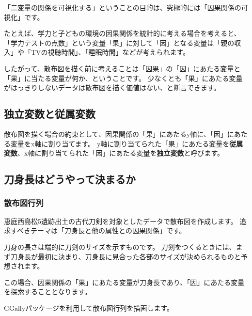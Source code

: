 \documentclass[]{article}
\newenvironment{Shaded}{\begin{snugshade}}{\end{snugshade}}
\newcommand{\CommentTok}[1]{\textcolor[rgb]{0.56,0.35,0.01}{\textit{#1}}}
\newcommand{\DataTypeTok}[1]{\textcolor[rgb]{0.13,0.29,0.53}{#1}}
\newcommand{\KeywordTok}[1]{\textcolor[rgb]{0.13,0.29,0.53}{\textbf{#1}}}
\newcommand{\NormalTok}[1]{#1}
\newcommand{\OperatorTok}[1]{\textcolor[rgb]{0.81,0.36,0.00}{\textbf{#1}}}
\newcommand{\StringTok}[1]{\textcolor[rgb]{0.31,0.60,0.02}{#1}}
\begin{document}
「二変量の関係を可視化する」ということの目的は、究極的には「因果関係の可視化」です。

たとえば、学力と子どもの環境の因果関係を統計的に考える場合を考えると、「学力テストの点数」という変量「果」に対して「因」となる変量は「親の収入」や「TVの視聴時間」、「睡眠時間」などが考えられます。

したがって、散布図を描く前に考えることは「因果」の「因」にあたる変量と「果」に当たる変量が何か、ということです。
少なくとも「果」にあたる変量がはっきりしないデータは散布図を描く価値はない、と断言できます。

\subsection{独立変数と従属変数}

散布図を描く場合の約束として、因果関係の「果」にあたるy軸に、「因」にあたる変量をx軸に割り当てます。
y軸に割り当てられた「果」にあたる変量を\textbf{従属変数}、x軸に割り当てられた「因」にあたる変量を\textbf{独立変数}と呼びます。

\subsection{刀身長はどうやって決まるか}

\subsubsection{散布図行列}

恵庭西島松5遺跡出土の古代刀剣を対象としたデータで散布図を作成します。
追求すべきテーマは「刀身長と他の属性との因果関係」です。

刀身の長さは端的に刀剣のサイズを示すものです。
刀剣をつくるときには、まず刀身長が最初に決まり、刀身長に見合った各部のサイズが決められるものと予想されます。

この場合、因果関係の「果」にあたる変量が刀身長であり、「因」にあたる変量を探索することとなります。

GGallyパッケージを利用して散布図行列を描画します。

\begin{Shaded}
\end{Shaded}
\end{document}
